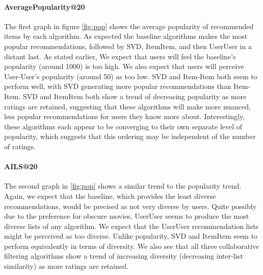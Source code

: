 \documentclass[letterpaper]{sig-alternate}
\begin{document}
  \paragraph{AveragePopularity@20}
  The first graph in figure \ref{fig:pop} shows the average popularity of recommended items by each algorithm.
  As expected the baseline algorithms makes the most popular recommendations, followed by SVD, ItemItem, and then UserUser in a distant last.
  As stated earlier, We expect that users will feel the baseline's popularity (around 1000) is too high.
  We also expect that users will perceive User-User's popularity (around 50) as too low.
  SVD and Item-Item both seem to perform well, with SVD generating more popular recommendations than Item-Item.
  SVD and ItemItem both show a trend of decreasing popularity as more ratings are retained, suggesting that these algorithms will make more nuanced, less popular recommendations for users they know more about.
  Interestingly, these algorithms each appear to be converging to their own separate level of popularity, which suggests that this ordering may be independent of the number of ratings.

  \paragraph{AILS@20}
  The second graph in \ref{fig:pop} shows a similar trend to the popularity trend.
  Again, we expect that the baseline, which provides the least diverse recommendations, would be precised as not very diverse by users.
  Quite possibly due to the preference for obscure movies, UserUser seems to produce the most diverse lists of any algorithm.
  We expect that the UserUser recommendation lists might be perceived as too diverse.
  Unlike popularity, SVD and ItemItem seem to perform equivalently in terms of diversity.
  We also see that all three collaborative filtering algorithms show a trend of increasing diversity (decreasing  inter-list similarity) as more ratings are retained.

\end{document}
